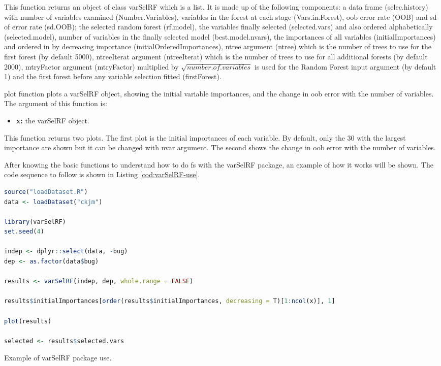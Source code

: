 This function returns an object of class varSelRF which is a list. It is made up of the following components: a data frame (selec.history) with number of variables examined (Number.Variables), variables in the forest at each stage (Vars.in.Forest), \acrlong{oob} error rate (OOB) and \acrlong{sd} of error rate (sd.OOB); the selected random forest (rf.model), the variables finally selected (selected.vars) and also ordered alphabetically (selected.model), number of variables in the finally selected model (best.model.nvars), the importances of all variables (initialImportances) and ordered in by decreasing importance (initialOrderedImportances), ntree argument (ntree) which is the number of trees to use for the first forest (by default 5000), ntreeIterat argument (ntreeIterat) which is the number of trees to use for all additional forests (by default 2000), mtryFactor argument (mtryFactor) multiplied by $\sqrt{number.of.variables}$ is used for the Random Forest input argument (by default 1) and the first forest before any variable selection fitted (firstForest).

plot function plots a varSelRF object, showing the initial variable importances, and the change in \acrshort{oob} error with the number of variables. The argument of this function is:

\begin{itemize}
    \item \textbf{x:} the varSelRF object.
\end{itemize}

This function returns two plots. The first plot is the initial importances of each variable. By default, only the 30 with the largest importance are shown but it can be changed with nvar argument. The second shows the change in \acrshort{oob} error with the number of variables.

After knowing the basic functions to understand how to do \acrshort{fs} with the varSelRF package, an example of how it works will be shown. The code sequence to follow is shown in Listing \ref{cod:varSelRF-use}.

\begin{codefloat}[H]
\begin{lstlisting}[language=R, style=Ccolor]
source("loadDataset.R")
data <- loadDataset("ckjm")

library(varSelRF)
set.seed(4)

indep <- dplyr::select(data, -bug)
dep <- as.factor(data$bug)

results <- varSelRF(indep, dep, whole.range = FALSE)

results$initialImportances[order(results$initialImportances, decreasing = T)[1:ncol(x)], 1]

plot(results)

selected <- results$selected.vars
\end{lstlisting}
\caption{Example of varSelRF package use.}
\label{cod:varSelRF-use}
\end{codefloat}

